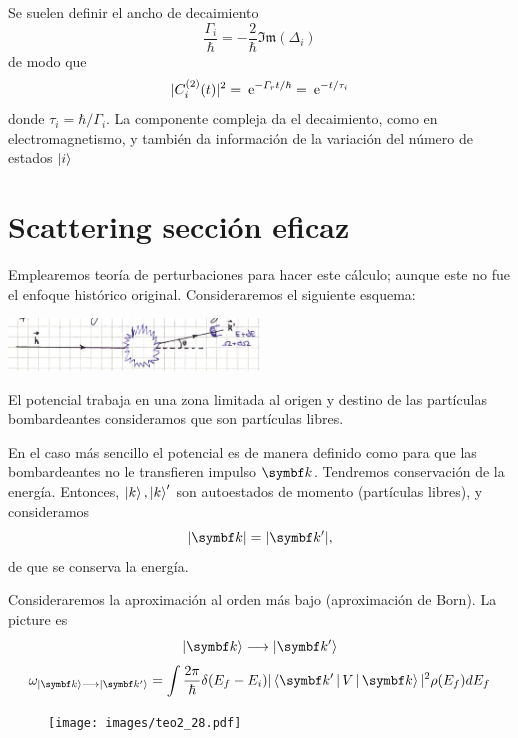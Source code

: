 \documentclass[10pt,oneside]{CBFT_book}
\begin{document}
Se suelen definir el ancho de decaimiento
\[
	\frac{\Gamma_i}{\hbar} = - \frac{2}{\hbar}\mathfrak{Im}(\Delta_i)
\]
de modo que
\[
	|C_i^{(2)}(t)|^2 = \:\mathrm{e}^{ - \Gamma_r t /\hbar} = \:\mathrm{e}^{ - t/\tau_i}
\]
donde $\tau_i = \hbar / \Gamma_i$. La componente compleja da el decaimiento, como en electromagnetismo,
y también da información de la variación del número de estados $\Ket{i}$

\section{Scattering sección eficaz}

Emplearemos teoría de perturbaciones para hacer este cálculo; aunque este no fue el enfoque histórico original.
Consideraremos el siguiente esquema:

\includegraphics[width=0.5\textwidth]{images/fig_ft2_scattering_section.jpg}

El potencial trabaja en una zona limitada al origen y destino de las partículas bombardeantes consideramos que
son partículas libres.

En el caso más sencillo el potencial es de manera definido como para que las bombardeantes no le transfieren
impulso $\vb k$. Tendremos conservación de la energía.
Entonces, $\Ket{k},\Ket{k}'$ son autoestados de momento (partículas libres), y consideramos
\[
	|\vb{k}| = |\vb{k}'|, 
\]
de que se conserva la energía. 

Consideraremos la aproximación al orden más bajo (aproximación de Born).
La picture es 
\[
	\Ket{\vb k} \longrightarrow \Ket{\vb k'}
\]
\[
	\omega_{\Ket{\vb k} \longrightarrow \Ket{\vb k'}} =
	\int \frac{2\pi}{\hbar} \delta( E_f - E_i ) |\Braket{\vb k'|V|\vb k}|^2 \rho(E_f) dE_f
\]

\begin{figure}[htb]
	\begin{center}
	\texttt{[image: images/teo2\_28.pdf]}
	
	\end{center}
	\caption{}
\end{figure} 
\end{document}
